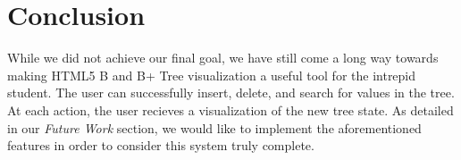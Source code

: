 \section{Conclusion}

While we did not achieve our final goal, we have still come a long way
towards making HTML5 B and B+ Tree visualization a useful tool for the
intrepid student. The user can successfully insert, delete, and search
for values in the tree. At each action, the user recieves a
visualization of the new tree state. As detailed in our \textit{Future
  Work} section, we would like to implement the aforementioned
features in order to consider this system truly complete.
